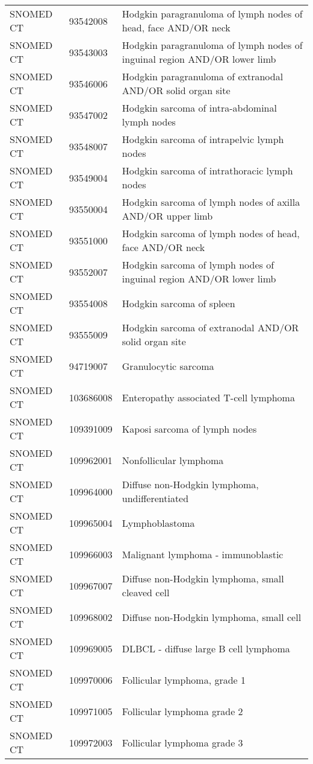 \begin{table}[ht]
\begin{tabular}{lll}
  SNOMED CT & 93542008 & Hodgkin paragranuloma of lymph nodes of head, face AND/OR neck \\ 
  SNOMED CT & 93543003 & Hodgkin paragranuloma of lymph nodes of inguinal region AND/OR lower limb \\ 
  SNOMED CT & 93546006 & Hodgkin paragranuloma of extranodal AND/OR solid organ site \\ 
  SNOMED CT & 93547002 & Hodgkin sarcoma of intra-abdominal lymph nodes \\ 
  SNOMED CT & 93548007 & Hodgkin sarcoma of intrapelvic lymph nodes \\ 
  SNOMED CT & 93549004 & Hodgkin sarcoma of intrathoracic lymph nodes \\ 
  SNOMED CT & 93550004 & Hodgkin sarcoma of lymph nodes of axilla AND/OR upper limb \\ 
  SNOMED CT & 93551000 & Hodgkin sarcoma of lymph nodes of head, face AND/OR neck \\ 
  SNOMED CT & 93552007 & Hodgkin sarcoma of lymph nodes of inguinal region AND/OR lower limb \\ 
  SNOMED CT & 93554008 & Hodgkin sarcoma of spleen \\ 
  SNOMED CT & 93555009 & Hodgkin sarcoma of extranodal AND/OR solid organ site \\ 
  SNOMED CT & 94719007 & Granulocytic sarcoma \\ 
  SNOMED CT & 103686008 & Enteropathy associated T-cell lymphoma \\ 
  SNOMED CT & 109391009 & Kaposi sarcoma of lymph nodes \\ 
  SNOMED CT & 109962001 & Nonfollicular lymphoma \\ 
  SNOMED CT & 109964000 & Diffuse non-Hodgkin lymphoma, undifferentiated \\ 
  SNOMED CT & 109965004 & Lymphoblastoma \\ 
  SNOMED CT & 109966003 & Malignant lymphoma - immunoblastic \\ 
  SNOMED CT & 109967007 & Diffuse non-Hodgkin lymphoma, small cleaved cell \\ 
  SNOMED CT & 109968002 & Diffuse non-Hodgkin lymphoma, small cell \\ 
  SNOMED CT & 109969005 & DLBCL - diffuse large B cell lymphoma \\ 
  SNOMED CT & 109970006 & Follicular lymphoma, grade 1 \\ 
  SNOMED CT & 109971005 & Follicular lymphoma grade 2 \\ 
  SNOMED CT & 109972003 & Follicular lymphoma grade 3 \\ 

\end{tabular}
\end{table}
